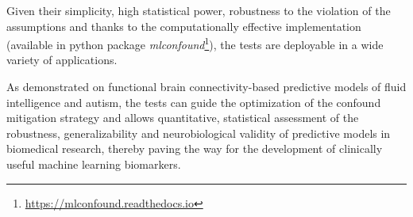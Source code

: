\documentclass{article}
\begin{document}
Given their simplicity, high statistical power, robustness to the violation of the assumptions and thanks to the computationally effective implementation (available in python package \emph{mlconfound}\footnote{\href{https://mlconfound.readthedocs.io}{https://mlconfound.readthedocs.io}}), the tests are deployable in a wide variety of applications.

As demonstrated on functional brain connectivity-based predictive models of fluid intelligence and autism, the tests can guide the optimization of the confound mitigation strategy and allows quantitative, statistical assessment of the robustness, generalizability and neurobiological validity of predictive models in biomedical research, thereby paving the way for the development of clinically useful machine learning biomarkers.

  


\newpage

\end{document}
